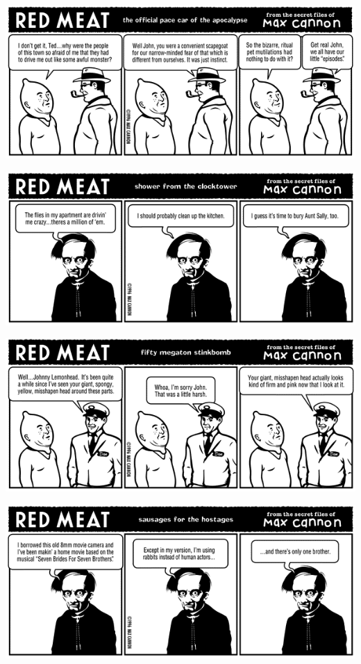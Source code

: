 \documentclass[a4paper,twoside,11pt]{article}
\begin{document}
\includegraphics[width=\textwidth]{redmeat_1996-08-05.png}



\includegraphics[width=\textwidth]{redmeat_1996-08-12.png}



\includegraphics[width=\textwidth]{redmeat_1996-08-19.png}



\includegraphics[width=\textwidth]{redmeat_1996-08-26.png}
\end{document}
